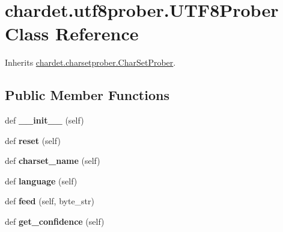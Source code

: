 \hypertarget{classchardet_1_1utf8prober_1_1_u_t_f8_prober}{}\section{chardet.\+utf8prober.\+U\+T\+F8\+Prober Class Reference}
\label{classchardet_1_1utf8prober_1_1_u_t_f8_prober}


Inherits \hyperlink{classchardet_1_1charsetprober_1_1_char_set_prober}{chardet.\+charsetprober.\+Char\+Set\+Prober}.

\subsection*{Public Member Functions}
\begin{DoxyCompactItemize}
\item 
\mbox{\label{classchardet_1_1utf8prober_1_1_u_t_f8_prober_af41ff9151e9d98dd6dbb9e88c3774680}} 
def {\bfseries \+\_\+\+\_\+init\+\_\+\+\_\+} (self)
\item 
\mbox{\label{classchardet_1_1utf8prober_1_1_u_t_f8_prober_a2d460d7c1fdafcd2af885ff5bbb36406}} 
def {\bfseries reset} (self)
\item 
\mbox{\label{classchardet_1_1utf8prober_1_1_u_t_f8_prober_afcd386c3d22bf7b84f6052d4552da99d}} 
def {\bfseries charset\+\_\+name} (self)
\item 
\mbox{\label{classchardet_1_1utf8prober_1_1_u_t_f8_prober_a494d5948e4c2c52253d8bfd29d11cd36}} 
def {\bfseries language} (self)
\item 
\mbox{\label{classchardet_1_1utf8prober_1_1_u_t_f8_prober_ac2240c1316c8ce532814c53f6f1237ae}} 
def {\bfseries feed} (self, byte\+\_\+str)
\item 
\mbox{\label{classchardet_1_1utf8prober_1_1_u_t_f8_prober_aaf7f2fe82338fef1960d57114887ac7e}} 
def {\bfseries get\+\_\+confidence} (self)
\end{DoxyCompactItemize}
